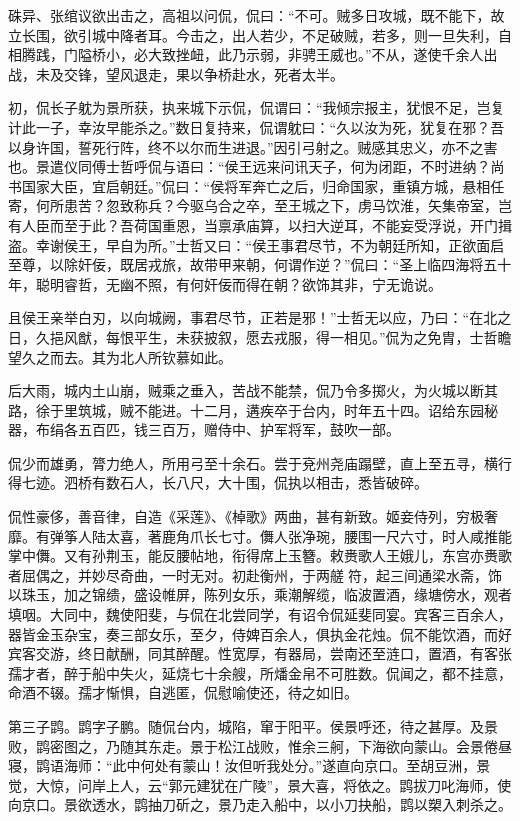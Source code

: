 \documentclass[12pt,UTF8]{ctexbook}
\begin{document}
硃异、张绾议欲出击之，高祖以问侃，侃曰：“不可。贼多日攻城，既不能下，故立长围，欲引城中降者耳。今击之，出人若少，不足破贼，若多，则一旦失利，自相腾践，门隘桥小，必大致挫衄，此乃示弱，非骋王威也。”不从，遂使千余人出战，未及交锋，望风退走，果以争桥赴水，死者太半。

初，侃长子躭为景所获，执来城下示侃，侃谓曰：“我倾宗报主，犹恨不足，岂复计此一子，幸汝早能杀之。”数日复持来，侃谓躭曰：“久以汝为死，犹复在邪？吾以身许国，誓死行阵，终不以尔而生进退。”因引弓射之。贼感其忠义，亦不之害也。景遣仪同傅士哲呼侃与语曰：“侯王远来问讯天子，何为闭距，不时进纳？尚书国家大臣，宜启朝廷。”侃曰：“侯将军奔亡之后，归命国家，重镇方城，悬相任寄，何所患苦？忽致称兵？今驱乌合之卒，至王城之下，虏马饮淮，矢集帝室，岂有人臣而至于此？吾荷国重恩，当禀承庙算，以扫大逆耳，不能妄受浮说，开门揖盗。幸谢侯王，早自为所。”士哲又曰：“侯王事君尽节，不为朝廷所知，正欲面启至尊，以除奸佞，既居戎旅，故带甲来朝，何谓作逆？”侃曰：“圣上临四海将五十年，聪明睿哲，无幽不照，有何奸佞而得在朝？欲饰其非，宁无诡说。

且侯王亲举白刃，以向城阙，事君尽节，正若是邪！”士哲无以应，乃曰：“在北之日，久挹风猷，每恨平生，未获披叙，愿去戎服，得一相见。”侃为之免胄，士哲瞻望久之而去。其为北人所钦慕如此。

后大雨，城内土山崩，贼乘之垂入，苦战不能禁，侃乃令多掷火，为火城以断其路，徐于里筑城，贼不能进。十二月，遘疾卒于台内，时年五十四。诏给东园秘器，布绢各五百匹，钱三百万，赠侍中、护军将军，鼓吹一部。

侃少而雄勇，膂力绝人，所用弓至十余石。尝于兗州尧庙蹋壁，直上至五寻，横行得七迹。泗桥有数石人，长八尺，大十围，侃执以相击，悉皆破碎。

侃性豪侈，善音律，自造《采莲》、《棹歌》两曲，甚有新致。姬妾侍列，穷极奢靡。有弹筝人陆太喜，著鹿角爪长七寸。儛人张净琬，腰围一尺六寸，时人咸推能掌中儛。又有孙荆玉，能反腰帖地，衔得席上玉簪。敕赉歌人王娥儿，东宫亦赉歌者屈偶之，并妙尽奇曲，一时无对。初赴衡州，于两艖符，起三间通梁水斋，饰以珠玉，加之锦缋，盛设帷屏，陈列女乐，乘潮解缆，临波置酒，缘塘傍水，观者填咽。大同中，魏使阳斐，与侃在北尝同学，有诏令侃延斐同宴。宾客三百余人，器皆金玉杂宝，奏三部女乐，至夕，侍婢百余人，俱执金花烛。侃不能饮酒，而好宾客交游，终日献酬，同其醉醒。性宽厚，有器局，尝南还至涟口，置酒，有客张孺才者，醉于船中失火，延烧七十余艘，所燔金帛不可胜数。侃闻之，都不挂意，命酒不辍。孺才惭惧，自逃匿，侃慰喻使还，待之如旧。

第三子鹍。鹍字子鹏。随侃台内，城陷，窜于阳平。侯景呼还，待之甚厚。及景败，鹍密图之，乃随其东走。景于松江战败，惟余三舸，下海欲向蒙山。会景倦昼寝，鹍语海师：“此中何处有蒙山！汝但听我处分。”遂直向京口。至胡豆洲，景觉，大惊，问岸上人，云“郭元建犹在广陵”，景大喜，将依之。鹍拔刀叱海师，使向京口。景欲透水，鹍抽刀斫之，景乃走入船中，以小刀抉船，鹍以槊入刺杀之。
\end{document}
